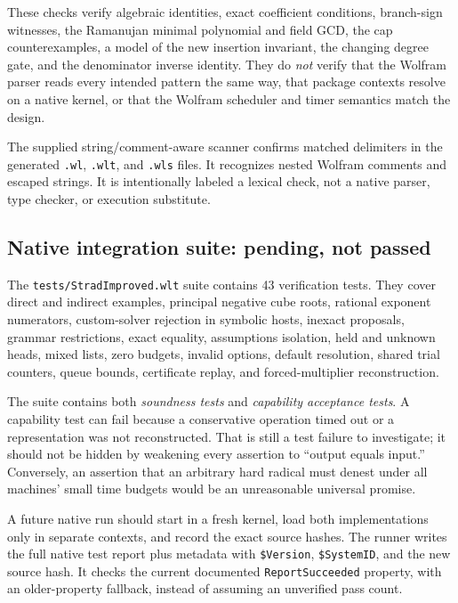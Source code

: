 \documentclass[11pt,letterpaper]{article}
\newcommand{\code}[1]{\texttt{#1}}
\theoremstyle{definition}
\begin{document}
These checks verify algebraic identities, exact coefficient conditions, branch-sign witnesses, the Ramanujan minimal polynomial and field GCD, the cap counterexamples, a model of the new insertion invariant, the changing degree gate, and the denominator inverse identity. They do \emph{not} verify that the Wolfram parser reads every intended pattern the same way, that package contexts resolve on a native kernel, or that the Wolfram scheduler and timer semantics match the design.

The supplied string/comment-aware scanner confirms matched delimiters in the generated \code{.wl}, \code{.wlt}, and \code{.wls} files. It recognizes nested Wolfram comments and escaped strings. It is intentionally labeled a lexical check, not a native parser, type checker, or execution substitute.

\subsection{Native integration suite: pending, not passed}

The \code{tests/StradImproved.wlt} suite contains 43 verification tests. They cover direct and indirect examples, principal negative cube roots, rational exponent numerators, custom-solver rejection in symbolic hosts, inexact proposals, grammar restrictions, exact equality, assumptions isolation, held and unknown heads, mixed lists, zero budgets, invalid options, default resolution, shared trial counters, queue bounds, certificate replay, and forced-multiplier reconstruction.

The suite contains both \emph{soundness tests} and \emph{capability acceptance tests}. A capability test can fail because a conservative operation timed out or a representation was not reconstructed. That is still a test failure to investigate; it should not be hidden by weakening every assertion to ``output equals input.'' Conversely, an assertion that an arbitrary hard radical must denest under all machines' small time budgets would be an unreasonable universal promise.

A future native run should start in a fresh kernel, load both implementations only in separate contexts, and record the exact source hashes. The runner writes the full native test report plus metadata with \code{\$Version}, \code{\$SystemID}, and the new source hash. It checks the current documented \code{ReportSucceeded} property, with an older-property fallback, instead of assuming an unverified pass count.\cite{testreport}
\end{document}

